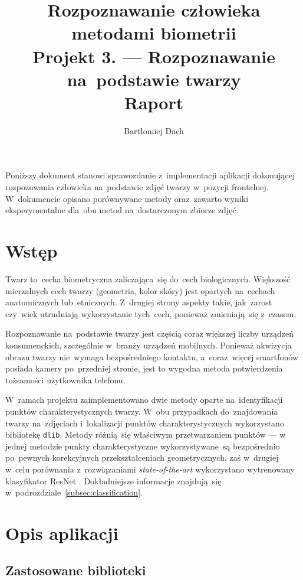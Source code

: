 \documentclass[11pt,a4paper]{article}
\begin{document}
\title{Rozpoznawanie człowieka metodami biometrii \\
\Large{
    Projekt 3. --- Rozpoznawanie na~podstawie twarzy \\
    Raport
}}
\author{Bartłomiej Dach}
\maketitle
Poniższy dokument stanowi sprawozdanie z~implementacji aplikacji dokonującej rozpoznwania człowieka na~podstawie zdjęć twarzy w~pozycji frontalnej.
W~dokumencie opisano porównywane metody oraz~zawarto wyniki eksperymentalne dla~obu metod na~dostarczonym zbiorze zdjęć.

\section{Wstęp}

Twarz to~cecha biometryczna zaliczająca~się do~cech biologicznych.
Większość mierzalnych cech twarzy (geometria, kolor skóry) jest opartych na~cechach anatomicznych lub~etnicznych.
Z~drugiej strony aspekty takie, jak~zarost czy~wiek utrudniają wykorzystanie tych~cech, ponieważ zmieniają~się z~czasem.

Rozpoznawanie na~podstawie twarzy jest częścią coraz większej liczby urządzeń konsumenckich, szczególnie w~branży urządzeń mobilnych.
Ponieważ akwizycja obrazu twarzy nie~wymaga bezpośredniego kontaktu, a~coraz~więcej smartfonów posiada kamery po~przedniej stronie, jest to wygodna metoda potwierdzenia tożsamości użytkownika telefonu.

W~ramach projektu zaimplementowano dwie metody oparte na~identyfikacji punktów charakterystycznych twarzy.
W~obu przypadkach do~znajdowania twarzy na~zdjęciach i~lokalizacji punktów charakterystycznych wykorzystano bibliotekę \texttt{dlib}.
Metody różnią~się właściwym przetwarzaniem punktów --- w jednej metodzie punkty charakterystyczne wykorzystywane~są bezpośrednio po~pewnych korekcyjnych przekształceniach geometrycznych, zaś w~drugiej w~celu porównania z~rozwiązaniami \emph{state-of-the-art} wykorzystano wytrenowany klasyfikator ResNet \cite{he2015, king2015}.
Dokładniejsze informacje znajdują~się w~podrozdziale~\ref{subsec:classification}.

\section{Opis aplikacji}

\subsection{Zastosowane biblioteki}
\end{document}
